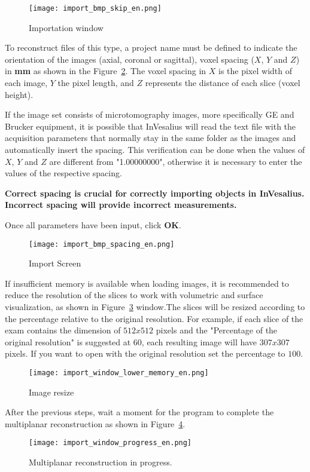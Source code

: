 \begin{figure}[!htb]
\centering
\texttt{[image: import\_bmp\_skip\_en.png]}
\caption{Importation window}
\label{fig:import_bmp_skip_pt}
\end{figure}

To reconstruct files of this type, a project name must be defined to indicate the orientation of the images (axial, coronal or sagittal), voxel spacing ($X$, $Y$ and $Z$) in \textbf{mm} as shown in the Figure~\ref{fig:import_bmp_spacing_pt}. The voxel spacing in $X$ is the pixel width of each image, $Y$ the pixel length, and $Z$ represents the distance of each slice (voxel height).

If the image set consists of microtomography images, more specifically GE and Brucker equipment, it is possible that InVesalius will read the text file with the acquisition parameters that normally stay in the same folder as the images and automatically insert the spacing. This verification can be done when the values of $X$, $Y$ and $Z$ are different from "1.00000000", otherwise it is necessary to enter the values of the respective spacing.

\textbf{Correct spacing is crucial for correctly importing objects in InVesalius. Incorrect spacing will provide incorrect measurements.}

Once all parameters have been input, click \textbf{OK}.

\begin{figure}[!htb]
\centering
\texttt{[image: import\_bmp\_spacing\_en.png]}
\caption{Import Screen}
\label{fig:import_bmp_spacing_pt}
\end{figure}

If insufficient memory is available when loading images, it is recommended to reduce the resolution of the slices to work with volumetric and surface visualization, as shown in Figure~\ref{fig:import_bmp_resize_pt} window.The slices will be resized according to the percentage relative to the original resolution. For example, if each slice of the exam contains the dimension of $512 x 512$ pixels and the "Percentage of the original resolution" is suggested at 60, each resulting image will have $307 x 307$ pixels. If you want to open with the original resolution set the percentage to $100$.

\begin{figure}[!htb]
\centering
\texttt{[image: import\_window\_lower\_memory\_en.png]}
\caption{Image resize}
\label{fig:import_bmp_resize_pt}
\end{figure}

After the previous steps, wait a moment for the program to complete the multiplanar reconstruction as shown in Figure~\ref{fig:import_bmp_mpr_pt.png}.

\begin{figure}[!htb]
\centering
\texttt{[image: import\_window\_progress\_en.png]}
\caption{Multiplanar reconstruction in progress.}
\label{fig:import_bmp_mpr_pt.png}
\end{figure}
